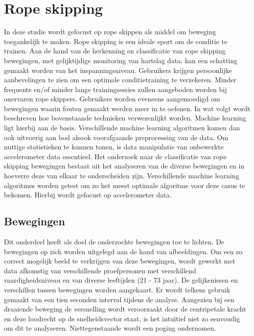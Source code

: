 \graphicspath{ {./rope_skipping/} }

\chapter{Rope skipping} \label{chapter:3}
In deze studie wordt gefocust op rope skippen als middel om beweging toegankelijk te maken. Rope skipping is een ideale sport om de conditie te trainen.
Aan de hand van de herkenning en classificatie van rope skipping bewegingen, met gelijktijdige monitoring van hartslag data, kan een schatting gemaakt worden van het inspanningsniveau. Gebruikers krijgen persoonlijke aanbevelingen te zien om een optimale conditietraining te verzekeren. Minder frequente en/of minder lange trainingsessies zullen aangeboden worden bij onervaren rope skippers. Gebruikers worden eveneens aangemoedigd om bewegingen waarin fouten gemaakt werden meer in te oefenen.
In wat volgt wordt beschreven hoe bovenstaande technieken verwezenlijkt worden. Machine learning ligt hierbij aan de basis. Verschillende machine learning algoritmen komen dan ook uitvoerig aan bod alsook voorafgaande preprocessing van de data. Om nuttige statistieken te kunnen tonen, is data manipulatie van onbewerkte accelerometer data essentieel.
Het onderzoek naar de classificatie van rope skipping bewegingen bestaat uit het analyseren van de diverse bewegingen en in hoeverre deze van elkaar te onderscheiden zijn. Verschillende machine learning algoritmes worden getest om zo het meest optimale algoritme voor deze casus te bekomen. Hierbij wordt gefocust op accelerometer data. 
 
\section{Bewegingen}
Dit onderdeel heeft als doel de onderzochte bewegingen toe te lichten. De bewegingen op zich worden uitgelegd aan de hand van afbeeldingen. Om een zo correct mogelijk beeld te verkrijgen van deze bewegingen, wordt gewerkt met data afkomstig van verschillende proefpersonen met verschillend vaardigheidsniveau en van diverse leeftijden (21 - 73 jaar). De gelijkenissen en verschillen tussen bewegingen worden aangekaart. Er wordt telkens gebruik gemaakt van een tien seconden interval tijdens de analyse.
Aangezien bij een draaiende beweging de versnelling wordt veroorzaakt door de centripetale kracht en deze loodrecht op de snelheidsvector staat, is het intuïtief niet zo eenvoudig om dit te analyseren. Niettegenstaande wordt een poging ondernomen.

